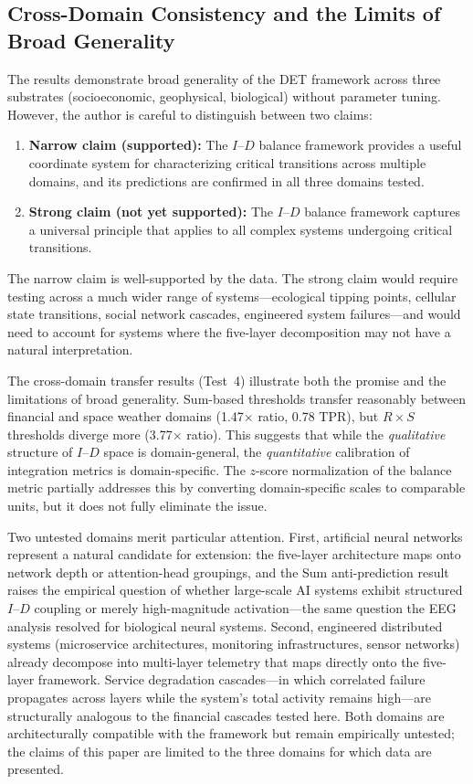 \documentclass[12pt,a4paper]{article}
\begin{document}
\subsection{Cross-Domain Consistency and the Limits of Broad Generality}

The results demonstrate broad generality of the DET framework across three substrates (socioeconomic, geophysical, biological) without parameter tuning. However, the author is careful to distinguish between two claims:

\begin{enumerate}
\item \textbf{Narrow claim (supported):} The $I$--$D$ balance framework provides a useful coordinate system for characterizing critical transitions across multiple domains, and its predictions are confirmed in all three domains tested.
\item \textbf{Strong claim (not yet supported):} The $I$--$D$ balance framework captures a universal principle that applies to all complex systems undergoing critical transitions.
\end{enumerate}

The narrow claim is well-supported by the data. The strong claim would require testing across a much wider range of systems---ecological tipping points, cellular state transitions, social network cascades, engineered system failures---and would need to account for systems where the five-layer decomposition may not have a natural interpretation.

The cross-domain transfer results (Test~4) illustrate both the promise and the limitations of broad generality. Sum-based thresholds transfer reasonably between financial and space weather domains (1.47$\times$ ratio, 0.78 TPR), but $R \times S$ thresholds diverge more (3.77$\times$ ratio). This suggests that while the \emph{qualitative} structure of $I$--$D$ space is domain-general, the \emph{quantitative} calibration of integration metrics is domain-specific. The $z$-score normalization of the balance metric partially addresses this by converting domain-specific scales to comparable units, but it does not fully eliminate the issue.

Two untested domains merit particular attention. First, artificial neural networks represent a natural candidate for extension: the five-layer architecture maps onto network depth or attention-head groupings, and the Sum anti-prediction result raises the empirical question of whether large-scale AI systems exhibit structured $I$--$D$ coupling or merely high-magnitude activation---the same question the EEG analysis resolved for biological neural systems. Second, engineered distributed systems (microservice architectures, monitoring infrastructures, sensor networks) already decompose into multi-layer telemetry that maps directly onto the five-layer framework. Service degradation cascades---in which correlated failure propagates across layers while the system's total activity remains high---are structurally analogous to the financial cascades tested here. Both domains are architecturally compatible with the framework but remain empirically untested; the claims of this paper are limited to the three domains for which data are presented.
\end{document}
